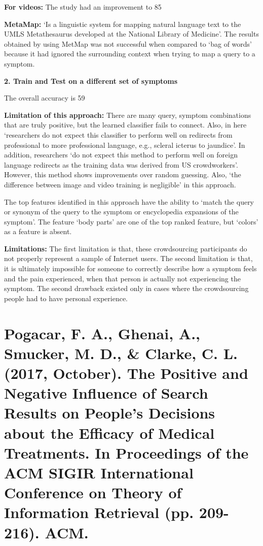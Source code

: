 \documentclass[]{article}
\begin{document}
\textbf{For videos:} The study had an improvement to 85%

\textbf{MetaMap:} ‘Is a linguistic system for mapping natural language text to the UMLS Metathesaurus developed at the National Library of Medicine’. The results obtained by using MetMap was not successful when compared to ‘bag of words’ because it had ignored the surrounding context when trying to map a query to a symptom.  

\textbf{2.	Train and Test on a different set of symptoms}

The overall accuracy is 59%

\textbf{Limitation of this approach:} There are many query, symptom combinations that are truly positive, but the learned classifier fails to connect. Also, in here ‘researchers do not expect this classifier to perform well on redirects from professional to more professional language, e.g., scleral icterus to jaundice’. In addition, researchers ‘do not expect this method to perform well on foreign language redirects as the training data was derived from US crowdworkers’. However, this method shows improvements over random guessing. Also, ‘the difference between image and video training is negligible’ in this approach.
  
The top features identified in this approach have the ability to ‘match the query or synonym of the query to the symptom or encyclopedia expansions of the symptom’. The feature ‘body parts’ are one of the top ranked feature, but ‘colors’ as a feature is absent. 

\textbf{Limitations:}  The first limitation is that, these crowdsourcing participants do not properly represent a sample of Internet users. The second limitation is that, it is ultimately impossible for someone to correctly describe how a symptom feels and the pain experienced, when that person is actually not experiencing the symptom. The second drawback existed only in cases where the crowdsourcing people had to have personal experience.     



\section{Pogacar, F. A., Ghenai, A., Smucker, M. D., \& Clarke, C. L. (2017, October). The Positive and Negative Influence of Search Results on People's Decisions about the Efficacy of Medical Treatments. In Proceedings of the ACM SIGIR International Conference on Theory of Information Retrieval (pp. 209-216). ACM.}
\end{document}

